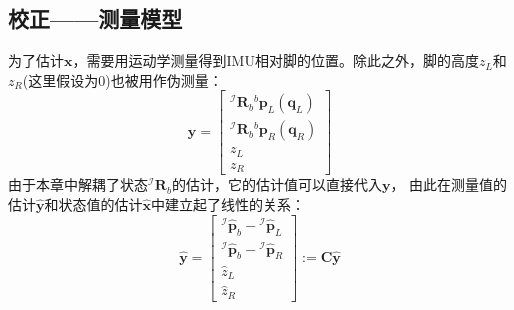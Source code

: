 \subsection{校正——测量模型}
为了估计$\boldsymbol{x}$，需要用运动学测量得到IMU相对脚的位置。除此之外，脚的高度$z_L$和$z_R$(这里假设为0)也被用作伪测量：
\begin{equation}
    \label{equ:est_posvel_mea}
    \boldsymbol{y}=\left[\begin{array}{c}
        { }^{\mathcal{I}} \boldsymbol{R}_b{ }^b \boldsymbol{p}_L\left(\boldsymbol{q}_L\right) \\
        { }^{\mathcal{I}} \boldsymbol{R}_b{ }^b \boldsymbol{p}_R\left(\boldsymbol{q}_R\right) \\
        z_L \\
        z_R
        \end{array}\right]
\end{equation}
由于本章中解耦了状态${ }^{\mathcal{I}} \boldsymbol{R}_{b}$的估计，它的估计值可以直接代入$\boldsymbol{y}$，
由此在测量值的估计$\hat{\boldsymbol{y}}$和状态值的估计$\hat{\boldsymbol{x}}$中建立起了线性的关系：
\begin{equation}
    \label{equ:est_mea_model}
    \hat{\boldsymbol{y}}=\left[\begin{array}{c}
        { }^{\mathcal{I}} \hat{\boldsymbol{p}}_b-{ }^{\mathcal{I}} \hat{\boldsymbol{p}}_L \\
        { }^{\mathcal{I}} \hat{\boldsymbol{p}}_b-{ }^{\mathcal{I}} \hat{\boldsymbol{p}}_R \\
        \hat{z}_L \\
        \hat{z}_R
        \end{array}\right]:=\boldsymbol{C} \hat{\boldsymbol{y}}
\end{equation}
